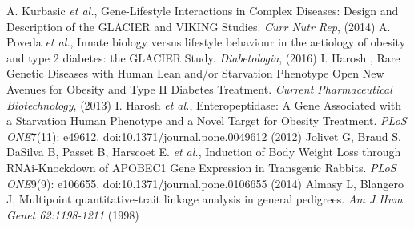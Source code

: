 \documentclass{article}
\begin{document}
\begin{thebibliography}{99} %
A. Kurbasic \textit{et al.}, Gene-Lifestyle Interactions in Complex Diseases: Design and Description of the GLACIER and VIKING Studies.
\newblock \textit{Curr Nutr Rep}, (2014)
A. Poveda \textit{et al.}, Innate biology versus lifestyle behaviour in the aetiology of obesity and type 2 diabetes: the GLACIER Study.
\newblock \textit{Diabetologia}, (2016)
I. Harosh , Rare Genetic Diseases with Human Lean and/or Starvation Phenotype Open New Avenues for Obesity and Type II Diabetes Treatment.
\newblock \textit{Current Pharmaceutical Biotechnology}, (2013)
I. Harosh \textit{et al.}, Enteropeptidase: A Gene Associated with a Starvation Human Phenotype and a Novel Target for Obesity Treatment.
\newblock \textit{PLoS ONE}7(11): e49612. doi:10.1371/journal.pone.0049612 (2012)
Jolivet G, Braud S, DaSilva B, Passet B, Harscoet E. \textit{et al.}, Induction of Body Weight Loss through RNAi-Knockdown of APOBEC1 Gene Expression in Transgenic Rabbits.
\newblock \textit{PLoS ONE}9(9): e106655. doi:10.1371/journal.pone.0106655 (2014)
Almasy L, Blangero J, Multipoint quantitative-trait linkage analysis in general pedigrees.
\newblock \textit{Am J Hum Genet 62:1198-1211} (1998)


\end{thebibliography}
\end{document}
